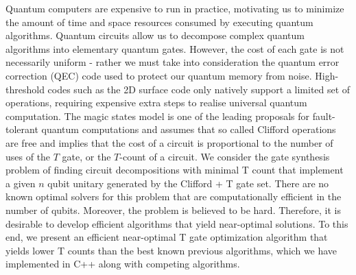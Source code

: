 \documentclass[a0,landscape]{a0poster}
\begin{document}
\begin{multicols}{3}
		
	
	\begin{minipage}[b]{\linewidth}
		\begin{tcolorbox}[title=\textcolor{white}{\huge\textbf{\textsf{Introduction}\textcolor{black}{y}}}]

			Quantum computers are expensive to run in practice, motivating us to minimize the amount of time and space resources consumed by executing quantum algorithms. Quantum circuits allow us to decompose complex quantum algorithms into elementary quantum gates. However, the cost of each gate is not necessarily uniform - rather we must take into consideration the quantum error correction (QEC) code used to protect our quantum memory from noise. High-threshold codes such as the 2D surface code \cite{29_Dennis_2002} only natively support a limited set of operations, requiring expensive extra steps to realise universal quantum computation. The magic states model \cite{32_Bravyi_2005} is one of the leading proposals for fault-tolerant quantum computations and assumes that so called Clifford operations are free and implies that the cost of a circuit is proportional to the number of uses of the $T$ gate, or the $T$-count of a circuit. We consider the gate synthesis problem of finding circuit decompositions with minimal T count that implement a given $n$ qubit unitary generated by the Clifford + T gate set. There are no known optimal solvers for this problem that are computationally efficient in the number of qubits. Moreover, the problem is believed to be hard. Therefore, it is desirable to develop efficient algorithms that yield near-optimal solutions. To this end, we present an efficient near-optimal T gate optimization algorithm that yields lower T counts than the best known previous algorithms, which we have implemented in C++ along with competing algorithms.

\end{tcolorbox}
\end{minipage}
\end{multicols}
\end{document}
